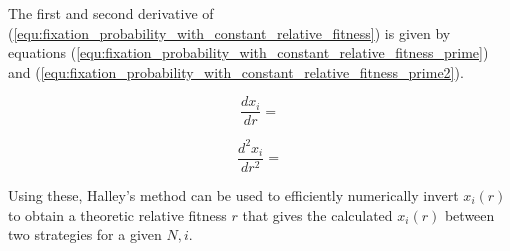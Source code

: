\documentclass{article}
\begin{document}
The first and second derivative of
(\ref{equ:fixation_probability_with_constant_relative_fitness}) is given by equations
(\ref{equ:fixation_probability_with_constant_relative_fitness_prime}) and
(\ref{equ:fixation_probability_with_constant_relative_fitness_prime2}).

\begin{equation}\label{equ:fixation_probability_with_constant_relative_fitness_prime}
    \frac{dx_i}{dr} = 
\end{equation}

\begin{equation}\label{equ:fixation_probability_with_constant_relative_fitness_prime2}
    \frac{d^2x_i}{dr^2} = 
\end{equation}

Using these, Halley's method \cite{Alefeld2012} can be used to efficiently
numerically invert \(x_i(r)\) to obtain a theoretic relative fitness \(r\) that
gives the calculated \(x_i(r)\) between two strategies for a given \(N, i\).
\end{document}
